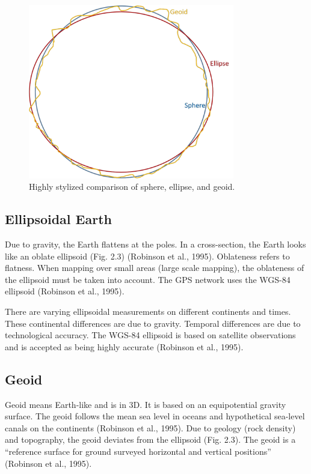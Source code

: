 \documentclass[a4paper , 12pt]{book}
\begin{document}
\begin{figure}[ht]
    \centering
    \includegraphics[width=9cm]{ch2f3.pdf}
    \caption{Highly stylized comparison of sphere, ellipse, and geoid.}
\end{figure}

\subsection{Ellipsoidal Earth}

Due to gravity, the Earth flattens at the poles. In a cross-section, the Earth looks like an oblate ellipsoid (Fig. 2.3) (Robinson et al., 1995). Oblateness refers to flatness. When mapping over small areas (large scale mapping), the oblateness of the ellipsoid must be taken into account. The GPS network uses the WGS-84 ellipsoid (Robinson et al., 1995).

There are varying ellipsoidal measurements on different continents and times. These continental differences are due to gravity. Temporal differences are due to technological accuracy. The WGS-84 ellipsoid is based on satellite observations and is accepted as being highly accurate (Robinson et al., 1995).

\subsection{Geoid}

Geoid means Earth-like and is in 3D. It is based on an equipotential gravity surface. The geoid follows the mean sea level in oceans and hypothetical sea-level canals on the continents (Robinson et al., 1995). Due to geology (rock density) and topography, the geoid deviates from the ellipsoid (Fig. 2.3). The geoid is a “reference surface for ground surveyed horizontal and vertical positions” (Robinson et al., 1995).
\end{document}
